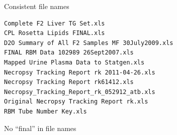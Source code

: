 \documentclass[aspectratio=169,12pt,t]{beamer}
\begin{document}
\begin{frame}[c]{}



  \note{

  }

\end{frame}






\begin{frame}[fragile]{Consistent file names}

\vspace*{-24pt}

\begin{semiverbatim}
\begin{lstlisting}
Complete F2 Liver TG Set.xls
CPL Rosetta Lipids FINAL.xls
D2O Summary of All F2 Samples MF 30July2009.xls
FINAL RBM Data 102989 26Sept2007.xls
Mapped Urine Plasma Data to Statgen.xls
Necropsy Tracking Report rk 2011-04-26.xls
Necropsy Tracking Report rk61412.xls
Necropsy_Tracking_Report_rk_052912_atb.xls
Original Necropsy Tracking Report rk.xls
RBM Tube Number Key.xls
\end{lstlisting}
\end{semiverbatim}

\vspace*{-24pt}


  \note{

  }

\end{frame}



\begin{frame}[c]{No ``{\hilit final}'' in file names}

\vspace*{3mm}

\centering



\end{frame}
\end{document}
